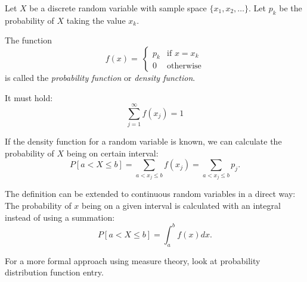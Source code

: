 \documentclass[12pt]{article}
\begin{document}
Let $X$ be a discrete random variable with sample space $\{x_1,x_2,\ldots\}$.
Let $p_k$ be the probability of $X$ taking the value $x_k$.

The function
$$
f(x)=\
\begin{cases}
p_k & \text{if }x=x_k\\
0 & \text{otherwise}
\end{cases}
$$
is called the \emph{probability function} or \emph{density function}.

It must hold:
$$\sum_{j=1}^{\infty} f(x_j)=1$$

If the density function for a random variable is known, we can calculate the probability of $X$ being on certain interval:
$$P[a<X\leq b] = \sum_{a<x_j\leq b}f(x_j) = \sum_{a<x_j\leq b}p_j.$$

The definition can be extended to continuous random variables in a direct way: The probability of $x$ being on a given interval is calculated with an integral instead of using a summation:
$$P[a<X\leq b] = \int_a^b f(x) dx.$$

For a more formal approach using measure theory, look at probability distribution function entry.
\end{document}
